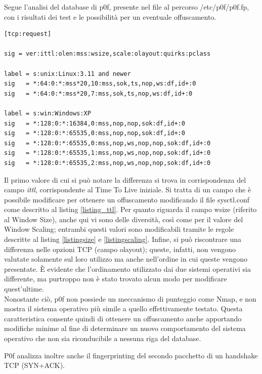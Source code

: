 Segue l'analisi del database di p0f, presente nel file al percorso /etc/p0f/p0f.fp, con i risultati dei test e le possibilità per un eventuale offuscamento.
\begin{lstlisting}[caption={Fingerptinting TCP con p0f}]
[tcp:request]

sig = ver:ittl:olen:mss:wsize,scale:olayout:quirks:pclass

label = s:unix:Linux:3.11 and newer
sig   = *:64:0:*:mss*20,10:mss,sok,ts,nop,ws:df,id+:0
sig   = *:64:0:*:mss*20,7:mss,sok,ts,nop,ws:df,id+:0

label = s:win:Windows:XP
sig   = *:128:0:*:16384,0:mss,nop,nop,sok:df,id+:0
sig   = *:128:0:*:65535,0:mss,nop,nop,sok:df,id+:0
sig   = *:128:0:*:65535,0:mss,nop,ws,nop,nop,sok:df,id+:0
sig   = *:128:0:*:65535,1:mss,nop,ws,nop,nop,sok:df,id+:0
sig   = *:128:0:*:65535,2:mss,nop,ws,nop,nop,sok:df,id+:0
\end{lstlisting}

Il primo valore di cui si può notare la differenza si trova in corrispondenza del campo \textit{ittl}, corrispondente al Time To Live iniziale.
Si tratta di un campo che è possibile modificare per ottenere un offuscamento modificando il file sysctl.conf come descritto al listing \ref{listing_ttl}.
Per quanto riguarda il campo wsize (riferito al Window Size), anche qui vi sono delle diversità, così come per il valore del Window Scaling; entrambi questi valori sono modificabili tramite le regole descritte al listing \ref{listingsize} e \ref{listingscaling}.
Infine, si può riscontrare una differenza nelle opzioni TCP (campo olayout); queste, infatti, non vengono valutate solamente sul loro utilizzo ma anche nell'ordine in cui queste vengono presentate. È evidente che l'ordinamento utilizzato dai due sistemi operativi sia differente, ma purtroppo non è stato trovato alcun modo per modificare quest'ultime.\\
Nonostante ciò, p0f non possiede un meccanismo di punteggio come Nmap, e non mostra il sistema operativo più simile a quello effettivamente testato. Questa caratteristica consente quindi di ottenere un offuscamento anche apportando modifiche minime al fine di determinare un nuovo comportamento del sistema operativo che non sia riconducibile a nessuna riga del database.

P0f analizza inoltre anche il fingerprinting del secondo pacchetto di un handshake TCP (SYN+ACK).

